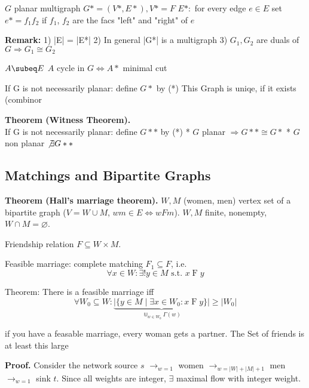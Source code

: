 


$G$ planar multigraph
$G*= (V*, E*), V*= F$
$E*: $ for every edge $e \in E$ set $e* = f_1 f_2$ if $f_1$, $f_2$ are the facs "left" and "right" of $e$


\textbf{Remark:}
1) |E| = |E*|
2) In general |G*| is a multigraph
3) $G_1, G_2$ are duals of $G \Rightarrow G_1 \cong G_2$

$A \subeq E$    
$A$ cycle in $G \iff A*$ minimal cut

If G is not necessarily planar: define $G*$ by (*)
This Graph is uniqe, if it exists (combinor

\textbf{Theorem (Witness Theorem).} \\
If G is not necessarily planar: define $G**$ by (*)
* $G$ planar $\Rightarrow G** \cong G*$
* $G$ non planar $\not\exists G**$



\subsection*{Matchings and Bipartite Graphs}

\textbf{Theorem (Hall's marriage theorem).}
$W, M$ (women, men) vertex set of a bipartite graph
($V=W\cup M$, $wm \in E \iff wFm$). $W,M$ finite, nonempty, $W\cap M=\varnothing$.

Friendship relation $F\subseteq W\times M$.

Feasible marriage: complete matching $F_1\subseteq F$, i.e.
\[ \forall x\in W: \exists! y\in M\text{ s.t. }x\operatorname{F} y \]

Theorem: There is a feasible marriage iff
\[
    \forall W_0\subseteq W:
        \underbrace{
            |\{y\in M\mid \exists x\in W_0: x\operatorname{F} y\}|
        }_{\Cup_{w\in W_0} \Gamma(w)}
        ≥ |W_0|
\]

if you have a feasable marriage, every woman gets a partner.
The Set of friends is at least this large

\textbf{Proof.}
Consider the network source $s$ $\rightarrow_{w=1}$ women $\rightarrow_{w=|W|+|M|+1}$ men $\rightarrow_{w=1}$ sink $t$.
Since all weights are integer, $\exists$ maximal flow with integer weight.

